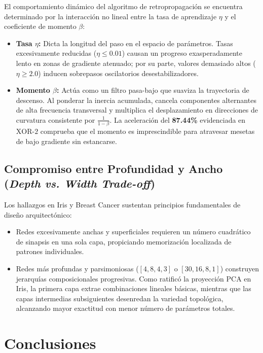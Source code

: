 \documentclass[11pt,letterpaper]{article}
\begin{document}
El comportamiento dinámico del algoritmo de retropropagación se encuentra determinado por la interacción no lineal entre la tasa de aprendizaje $\eta$ y el coeficiente de momento $\beta$:
\begin{itemize}
    \item \textbf{Tasa $\eta$:} Dicta la longitud del paso en el espacio de parámetros. Tasas excesivamente reducidas ($\eta \le 0.01$) causan un progreso exasperadamente lento en zonas de gradiente atenuado; por su parte, valores demasiado altos ($\eta \ge 2.0$) inducen sobrepasos oscilatorios desestabilizadores.
    \item \textbf{Momento $\beta$:} Actúa como un filtro pasa-bajo que suaviza la trayectoria de descenso. Al ponderar la inercia acumulada, cancela componentes alternantes de alta frecuencia transversal y multiplica el desplazamiento en direcciones de curvatura consistente por $\frac{1}{1-\beta}$. La aceleración del \textbf{87.44\%} evidenciada en $\text{XOR-2}$ comprueba que el momento es imprescindible para atravesar mesetas de bajo gradiente sin estancarse.
\end{itemize}

\subsection{Compromiso entre Profundidad y Ancho (\textit{Depth vs. Width Trade-off})}

Los hallazgos en Iris y Breast Cancer sustentan principios fundamentales de diseño arquitectónico:
\begin{itemize}
    \item Redes excesivamente anchas y superficiales requieren un número cuadrático de sinapsis en una sola capa, propiciando memorización localizada de patrones individuales.
    \item Redes más profundas y parsimoniosas ($[4, 8, 4, 3]$ o $[30, 16, 8, 1]$) construyen jerarquías composicionales progresivas. Como ratificó la proyección PCA en Iris, la primera capa extrae combinaciones lineales básicas, mientras que las capas intermedias subsiguientes desenredan la variedad topológica, alcanzando mayor exactitud con menor número de parámetros totales.
\end{itemize}

\section{Conclusiones}
\label{sec:conclusiones}
\end{document}
